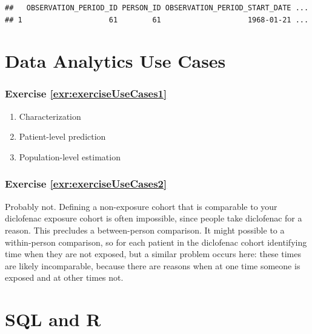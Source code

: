 \documentclass[11pt]{book}
\theoremstyle{definition}
\theoremstyle{definition}
\theoremstyle{definition}
\theoremstyle{remark}
\begin{document}
\begin{verbatim}
##   OBSERVATION_PERIOD_ID PERSON_ID OBSERVATION_PERIOD_START_DATE ...
## 1                    61        61                    1968-01-21 ...
\end{verbatim}

\hypertarget{UseCasesanswers}{%
\section{Data Analytics Use Cases}\label{UseCasesanswers}}

\hypertarget{exercise-refexrexerciseusecases1}{%
\subsubsection*{Exercise \ref{exr:exerciseUseCases1}}\label{exercise-refexrexerciseusecases1}}

\begin{enumerate}
\def\labelenumi{\arabic{enumi}.}
\item
  Characterization
\item
  Patient-level prediction
\item
  Population-level estimation
\end{enumerate}

\hypertarget{exercise-refexrexerciseusecases2}{%
\subsubsection*{Exercise \ref{exr:exerciseUseCases2}}\label{exercise-refexrexerciseusecases2}}

Probably not. Defining a non-exposure cohort that is comparable to your diclofenac exposure cohort is often impossible, since people take diclofenac for a reason. This precludes a between-person comparison. It might possible to a within-person comparison, so for each patient in the diclofenac cohort identifying time when they are not exposed, but a similar problem occurs here: these times are likely incomparable, because there are reasons when at one time someone is exposed and at other times not.

\hypertarget{SqlAndRanswers}{%
\section{SQL and R}\label{SqlAndRanswers}}
\end{document}
